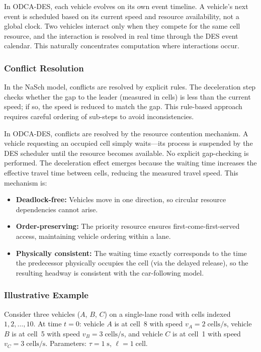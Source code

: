\documentclass[review,authoryear]{elsarticle}
\begin{document}
In ODCA-DES, each vehicle evolves on its own event timeline. A vehicle's next event is scheduled based on its current speed and resource availability, not a global clock. Two vehicles interact only when they compete for the same cell resource, and the interaction is resolved in real time through the DES event calendar. This naturally concentrates computation where interactions occur.

\subsubsection{Conflict Resolution}

In the NaSch model, conflicts are resolved by explicit rules. The deceleration step checks whether the gap to the leader (measured in cells) is less than the current speed; if so, the speed is reduced to match the gap. This rule-based approach requires careful ordering of sub-steps to avoid inconsistencies.

In ODCA-DES, conflicts are resolved by the resource contention mechanism. A vehicle requesting an occupied cell simply waits---its process is suspended by the DES scheduler until the resource becomes available. No explicit gap-checking is performed. The deceleration effect emerges because the waiting time increases the effective travel time between cells, reducing the measured travel speed. This mechanism is:
\begin{itemize}
    \item \textbf{Deadlock-free:} Vehicles move in one direction, so circular resource dependencies cannot arise.
    \item \textbf{Order-preserving:} The priority resource ensures first-come-first-served access, maintaining vehicle ordering within a lane.
    \item \textbf{Physically consistent:} The waiting time exactly corresponds to the time the predecessor physically occupies the cell (via the delayed release), so the resulting headway is consistent with the car-following model.
\end{itemize}

\subsubsection{Illustrative Example}

Consider three vehicles ($A$, $B$, $C$) on a single-lane road with cells indexed $1, 2, \ldots, 10$. At time $t=0$: vehicle $A$ is at cell~8 with speed $v_A = 2\;\text{cells/s}$, vehicle $B$ is at cell~5 with speed $v_B = 3\;\text{cells/s}$, and vehicle $C$ is at cell~1 with speed $v_C = 3\;\text{cells/s}$. Parameters: $\tau = 1\;\text{s}$, $\ell = 1\;\text{cell}$.
\end{document}
